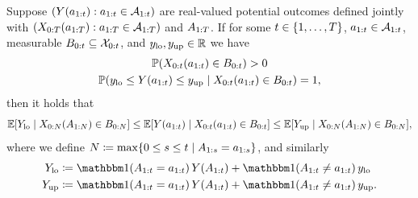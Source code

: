 \begin{theorem} \label{thm:causal-bounds}
    Suppose $(Y(a_{1:t}) : a_{1:t} \in \mathcal{A}_{1:t})$ are real-valued potential outcomes defined jointly with $(X_{0:T}(a_{1:T}) : a_{1:T} \in \mathcal{A}_{1:T})$ and $A_{1:T}$. If for some $t \in \{1, \ldots, T\}$, $a_{1:t} \in \mathcal{A}_{1:t}$, measurable $B_{0:t} \subseteq \mathcal{X}_{0:t}$, and $y_{\mathrm{lo}}, y_{\mathrm{up}} \in \mathbb{R}$ we have
\noindent
% 
    \begin{gather}
        \mathbb{P}(X_{0:t}(a_{1:t}) \in B_{0:t}) > 0 \label{eq:B-positivity-assumption} \\
        \mathbb{P}(y_{\mathrm{lo}} \leq Y(a_{1:t}) \leq y_{\mathrm{up}} \mid X_{0:t}(a_{1:t}) \in B_{0:t}) = 1,  \label{eq:Y-boundedness-assumption}
    \end{gather}
    \noindent then it holds that
    \begin{equation} \label{eq:causal-bounds-fully-written}
        \mathbb{E}[Y_{\mathrm{lo}} \mid X_{0:N}(A_{1:N}) \in B_{0:N}]
        \leq \mathbb{E}[Y(a_{1:t}) \mid X_{0:t}(a_{1:t}) \in B_{0:t}]
        \leq  \mathbb{E}[Y_{\mathrm{up}} \mid X_{0:N}(A_{1:N}) \in B_{0:N}],
    \end{equation}
    where we define $N \coloneqq \max \{0 \leq s \leq t \mid A_{1:s} = a_{1:s}\}$, and similarly
    \begin{align*}
        \Ylo \coloneqq \ind(\A_{1:\tx} &= \ax_{1:\tx}) \, \Y(\A_{1:\tx}) + \ind(\A_{1:\tx} \neq \ax_{1:\tx}) \, \ylo \\
        \Yup \coloneqq \ind(\A_{1:\tx} &= \ax_{1:\tx}) \, \Y(\A_{1:\tx}) + \ind(\A_{1:\tx} \neq \ax_{1:\tx}) \, \yup.
    \end{align*}


\end{theorem}
